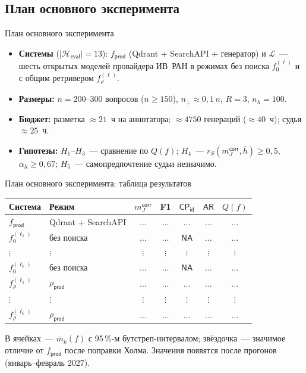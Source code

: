 \documentclass[t]{beamer}
\let\mathrm\mathsf  %
\newcommand{\Heval}{\mathcal{H}_{\mathrm{eval}}}
\newcommand{\Lm}{\mathcal{L}}
\newcommand{\fprod}{f_{\mathrm{prod}}}
\newcommand{\refuse}{\bot}
\newcommand{\NA}{\mathrm{NA}}
\newcommand{\mcorr}{m_J^{\mathrm{corr}}}
\newcommand{\CP}{\mathrm{CP}}
\newcommand{\AR}{\mathrm{AR}}
\newcommand{\rS}{r_{S}}
\begin{document}
\subsection{План основного эксперимента}

\begin{frame}{План основного эксперимента}
    \begin{itemize}
        \item \textbf{Системы} ($|\Heval|=13$): $\fprod$ (Qdrant + SearchAPI + генератор) и $\Lm$~--- шесть открытых моделей провайдера ИВ~РАН в режимах без поиска $f_0^{(\ell)}$ и с общим ретривером $f_\rho^{(\ell)}$.
        \item \textbf{Размеры:} $n=200$--$300$ вопросов ($n\ge150$), $n_{\refuse}\approx0{,}1\,n$, $R=3$, $n_h=100$.
        \item \textbf{Бюджет:} разметка $\approx21$~ч на аннотатора; $\approx4750$ генераций ($\approx40$~ч); судья $\approx25$~ч.
        \item \textbf{Гипотезы:} $H_1$--$H_3$~--- сравнение по $Q(f)$; $H_4$~--- $\rS(\mcorr,\bar h)\ge0{,}5$, $\alpha_h\ge0{,}67$; $H_5$~--- самопредпочтение судьи незначимо.
    \end{itemize}
\end{frame}

\begin{frame}{План основного эксперимента: таблица результатов}
    \begin{center}
        \footnotesize
        \setlength{\tabcolsep}{4pt}
        \begin{tabular}{@{}llccccc@{}}
            \toprule
            Система & Режим & $\mcorr$ & F1 & $\CP_{\mathrm{id}}$ & $\AR$ & $Q(f)$ \\
            \midrule
            $\fprod$ & Qdrant + SearchAPI & $\dots$ & $\dots$ & $\dots$ & $\dots$ & $\dots$ \\
            \midrule
            $f_0^{(\ell_1)}$ & без поиска & $\dots$ & $\dots$ & $\NA$ & $\dots$ & $\dots$ \\
            $\vdots$ & $\vdots$ & $\vdots$ & $\vdots$ & $\vdots$ & $\vdots$ & $\vdots$ \\
            $f_0^{(\ell_6)}$ & без поиска & $\dots$ & $\dots$ & $\NA$ & $\dots$ & $\dots$ \\
            \midrule
            $f_\rho^{(\ell_1)}$ & $\rho_{\mathrm{prod}}$ & $\dots$ & $\dots$ & $\dots$ & $\dots$ & $\dots$ \\
            $\vdots$ & $\vdots$ & $\vdots$ & $\vdots$ & $\vdots$ & $\vdots$ & $\vdots$ \\
            $f_\rho^{(\ell_6)}$ & $\rho_{\mathrm{prod}}$ & $\dots$ & $\dots$ & $\dots$ & $\dots$ & $\dots$ \\
            \bottomrule
        \end{tabular}
    \end{center}
    \small
    В ячейках~--- $\bar m_k(f)$ с 95\,\%-м бутстреп-интервалом; звёздочка~--- значимое отличие от $\fprod$ после поправки Холма. Значения появятся после прогонов (январь--февраль 2027).
\end{frame}
\end{document}
